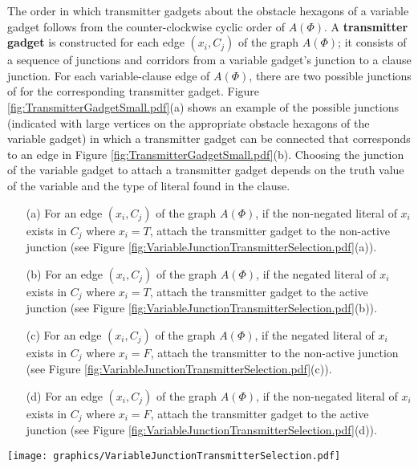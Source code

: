 The order in which transmitter gadgets about the obstacle hexagons of a variable gadget follows from the counter-clockwise cyclic order of $A(\Phi)$. 
A {\bf transmitter gadget} is constructed for each edge $(x_i,C_j)$ of the graph $A(\Phi)$; it consists of a sequence of junctions and corridors from a variable gadget's junction to a clause junction.
For each variable-clause edge of $A(\Phi)$, there are two possible junctions of for the corresponding transmitter gadget.
Figure \ref{fig:TransmitterGadgetSmall.pdf}(a) shows an example of the possible junctions (indicated with large vertices on the appropriate obstacle hexagons of the variable gadget) in which a transmitter gadget can be connected that corresponds to an edge in Figure \ref{fig:TransmitterGadgetSmall.pdf}(b).
Choosing the junction of the variable gadget to attach a transmitter gadget depends on the truth value of the variable and the type of literal found in the clause.
\begin{itemize}
\item[(a)]  For an edge $(x_i,C_j)$ of the graph $A(\Phi)$, if the non-negated literal of $x_i$ exists in $C_j$ where $x_i=T$, attach the transmitter gadget to the non-active junction (see Figure \ref{fig:VariableJunctionTransmitterSelection.pdf}(a)).
\item[(b)]  For an edge $(x_i,C_j)$ of the graph $A(\Phi)$, if the negated literal of $x_i$ exists in $C_j$ where $x_i=T$, attach the transmitter gadget to the active junction (see Figure \ref{fig:VariableJunctionTransmitterSelection.pdf}(b)).
\item[(c)] For an edge $(x_i,C_j)$ of the graph $A(\Phi)$, if the negated literal of $x_i$ exists in $C_j$ where $x_i=F$, attach the transmitter to the non-active junction (see Figure \ref{fig:VariableJunctionTransmitterSelection.pdf}(c)).
\item[(d)] For an edge $(x_i,C_j)$ of the graph $A(\Phi)$, if the non-negated literal of $x_i$ exists in $C_j$ where $x_i=F$, attach the transmitter gadget to the active junction (see Figure \ref{fig:VariableJunctionTransmitterSelection.pdf}(d)).
\end{itemize}

\begin{minipage}{\linewidth}
\begin{center}
\texttt{[image: graphics/VariableJunctionTransmitterSelection.pdf]}
\label{fig:VariableJunctionTransmitterSelection.pdf}
\end{center}
\end{minipage} 

